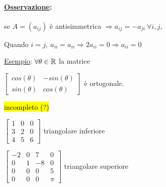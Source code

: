 \documentclass{article}
\begin{document}


\paragraph*{\ul{Osservazione}:} se $A=(a_{ij})$ è antisimmetrica $\Rightarrow a_{ij}=-a_{ji}\ \forall i,j$,

Quando $i=j,\ a_{ii}=a_{ii}\Rightarrow2a_{ii}=0\Rightarrow a_{ii}=0$



\ul{Esempio}: $\forall\theta\in\mathbb{R}$ la matrice

$\begin{bmatrix}
		cos(\theta) & -sin(\theta) \\sin(\theta)&cos(\theta)
	\end{bmatrix}$ è ortogonale.

\hl{incompleto (?)}

$\begin{bmatrix}
		1 & 0 & 0 \\3&2&0\\4&5&6
	\end{bmatrix}$ triangolare inferiore\vspace*{1em}

$\begin{bmatrix}
		-2 & 0 & 7 & 0 \\0&1&-8&0\\
		0  & 0 & 0 & 5 \\0&0&0&\pi
	\end{bmatrix}$ triangolare superiore\vspace*{1em}
\end{document}
